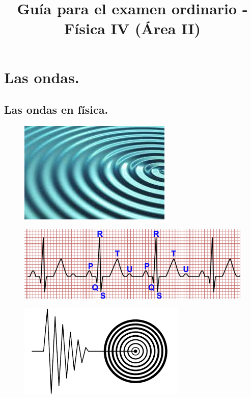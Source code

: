 \documentclass[12pt, letter]{article}
\title{Guía para el examen ordinario - Física IV (Área II)}
\date{}
\begin{document}
\maketitle

\section{Las ondas.}

\subsection{Las ondas en física.}


\begin{figure}[H]
    \centering
    \includegraphics[scale=0.9]{Imagenes/Ondas_01.jpg}
\end{figure}
\begin{figure}[H]
    \centering
    \includegraphics[scale=0.5]{Imagenes/Ondas_02.png}
\end{figure}
\begin{figure}[H]
    \centering
    \includegraphics[scale=0.6]{Imagenes/Ondas_03.png}
\end{figure}
\end{document}
